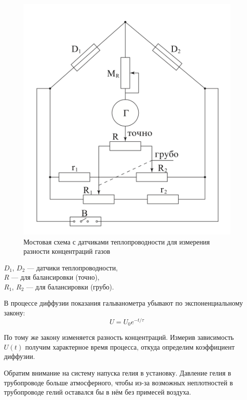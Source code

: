 \documentclass[a4paper,12pt]{article} %
\begin{document}
\begin{figure}[h]
  \centering
  \includegraphics[scale = 0.40]{bridge.png}
  \caption{Мостовая схема с датчиками теплопроводности для измерения разности концентраций газов}
  \label{fig:bridge}
\end{figure}

\noindent $D_1$, $D_2$ — датчики теплопроводности, \\
$R$ — для балансировки (точно), \\
$R_1$, $R_2$ — для балансировки (грубо).

В процессе диффузии показания гальванометра убывают по экспоненциальному закону:
\begin{equation}
  U = U_0 e^{-t/\tau}
\end{equation}

По тому же закону изменяется разность концентраций. Измерив зависимость $U(t)$ получим характерное время процесса, откуда определим коэффициент диффузии.

\medskip

Обратим внимание на систему напуска гелия в установку. 
Давление гелия в трубопроводе больше атмосферного, чтобы из-за возможных неплотностей в трубопроводе гелий оставался бы в нём без примесей воздуха.
\end{document}
